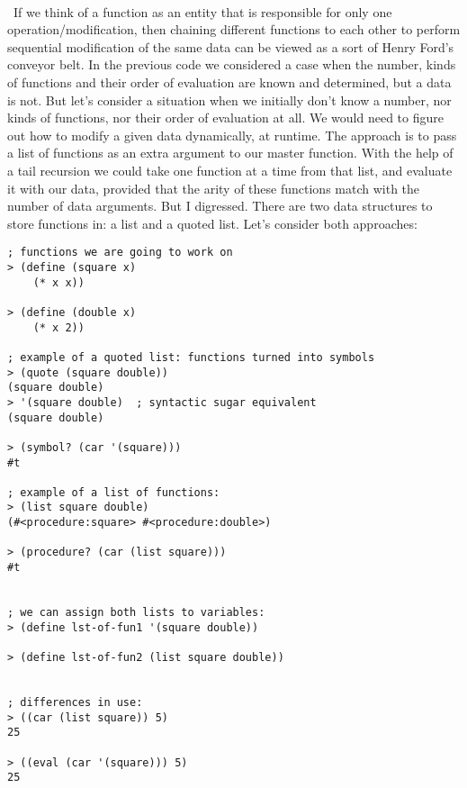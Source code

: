 \documentclass{article}
\begin{document}
\paragraph{}\
If we think of a function as an entity that is responsible for only one operation/modification, then chaining different functions to each other to perform sequential modification of the same data can be viewed as a sort of Henry Ford's conveyor belt. In the previous code we considered a case when the number, kinds of functions and their order of evaluation are known and determined, but a data is not. But let's consider a situation when we initially don't know a number, nor kinds of functions, nor their order of evaluation at all. We would need to figure out how to modify a given data dynamically, at runtime. The approach is to pass a list of functions as an extra argument to our master function. With the help of a tail recursion we could take one function at a time from that list, and evaluate it with our data, provided that the arity of these functions match with the number of data arguments. But I digressed. There are two data structures to store functions in: a list and a quoted list. Let's consider both approaches:

\begin{verbatim} 
; functions we are going to work on
> (define (square x)
    (* x x))

> (define (double x)
    (* x 2))

; example of a quoted list: functions turned into symbols
> (quote (square double))
(square double)
> '(square double)	; syntactic sugar equivalent
(square double)

> (symbol? (car '(square)))
#t

; example of a list of functions:
> (list square double)
(#<procedure:square> #<procedure:double>)

> (procedure? (car (list square)))
#t


; we can assign both lists to variables: 
> (define lst-of-fun1 '(square double))

> (define lst-of-fun2 (list square double))


; differences in use:
> ((car (list square)) 5)
25

> ((eval (car '(square))) 5)
25
\end{verbatim}

\paragraph{}\
\end{document}
